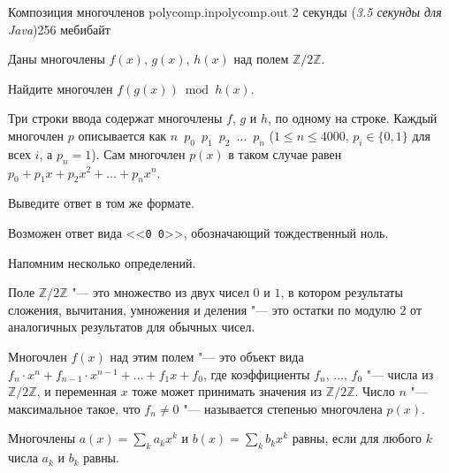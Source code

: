 
\gdef\thisproblemauthor{Сергей Копелиович}
\gdef\thisproblemdeveloper{Сергей Копелиович}
\begin{problem}{Композиция многочленов}
{polycomp.in}{polycomp.out}
{2 секунды (\textsl{3.5 секунды для Java})}{256 мебибайт}{}

Даны многочлены $f(x)$, $g(x)$, $h(x)$ над полем $\mathbb{Z}/2\mathbb{Z}$.

Найдите многочлен $f(g(x)) \bmod h(x)$.

\InputFile

Три строки ввода содержат многочлены $f$, $g$ и $h$, по одному на строке.
Каждый многочлен $p$ описывается как
$n$~$p_0$~$p_1$~$p_2$~$\dots$~$p_n$
($1 \le n \le 4000$, $p_i \in \{0, 1\}$ для всех $i$, а $p_n = 1$).
Сам многочлен $p(x)$ в таком случае равен
$p_0 + p_1 x + p_2 x^2 + \dots + p_n x^n$.
                                                                                                     
\OutputFile

Выведите ответ в том же формате.

Возможен ответ вида <<\texttt{0~0}>>, обозначающий тождественный ноль.

\Examples

\begin{example}
%
%
\end{example}

\Note

Напомним несколько определений.

Поле $\mathbb{Z}/2\mathbb{Z}$ "--- это множество из двух чисел $0$ и $1$,
в котором результаты сложения, вычитания, умножения и деления "---
это остатки по модулю $2$ от аналогичных результатов для обычных чисел.

Многочлен $f(x)$ над этим полем "--- это объект вида
$f_n \cdot x^n + f_{n - 1} \cdot x^{n - 1} + \ldots + f_1 x + f_0$,
где коэффициенты $f_n$, $\ldots$, $f_0$ "--- числа из
$\mathbb{Z}/2\mathbb{Z}$, и переменная $x$ тоже может принимать
значения из $\mathbb{Z}/2\mathbb{Z}$.
Число $n$ "--- максимальное такое, что $f_n \ne 0$ "--- называется
степенью многочлена $p(x)$.

Многочлены $a(x) = \sum \limits _k a_k x^k$ и
$b(x) = \sum \limits _k b_k x^k$ равны, если
для любого $k$ числа $a_k$ и $b_k$ равны.


\end{problem}
